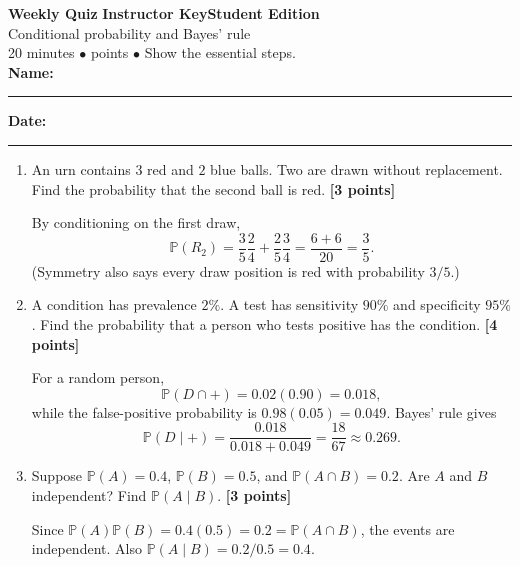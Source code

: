\documentclass[11pt]{article}
\newcounter{quiznum}
\newcommand{\Prob}{\mathbb P}
\newcommand{\edition}{\ifanswers Instructor Key\else Student Edition\fi}
\newcommand{\points}[1]{\hfill{\small\color{rose}\textbf{[#1 points]}}}
\newcommand{\quizheading}[1]{%
  \clearpage\stepcounter{quiznum}%
  \begin{tcolorbox}[
    enhanced,colback=paper,colframe=indigo,boxrule=1.1pt,arc=2mm,
    left=4mm,right=4mm,top=2.5mm,bottom=2.5mm,
    borderline west={4pt}{0pt}{violet}]
    {\Large\bfseries\color{indigo}Weekly Quiz \thequiznum}\hfill
    {\bfseries\color{violet}\edition}\\[-1pt]
    {\large\color{ink}#1}\\[2pt]
    {\small\color{muted}20 minutes \quad $\bullet$ \quad 10 points \quad $\bullet$ \quad Show the essential steps.}
    \ifanswers\else
      \\[5pt]\textbf{Name:}\ \rule{0.48\linewidth}{0.4pt}\hfill
      \textbf{Date:}\ \rule{0.20\linewidth}{0.4pt}
    \fi
  \end{tcolorbox}
}
\begin{document}
\quizheading{Conditional probability and Bayes' rule}
\begin{enumerate}
  \item An urn contains $3$ red and $2$ blue balls. Two are drawn without
  replacement. Find the probability that the second ball is red. \points{3}
  \begin{solution}[1.25in]
    By conditioning on the first draw,
    \[
    \Prob(R_2)=\frac35\frac24+\frac25\frac34=\frac{6+6}{20}=\frac35.
    \]
    (Symmetry also says every draw position is red with probability $3/5$.)
  \end{solution}

  \item A condition has prevalence $2\%$. A test has sensitivity $90\%$ and
  specificity $95\%$. Find the probability that a person who tests positive has
  the condition. \points{4}
  \begin{solution}[1.55in]
    For a random person,
    \[
      \Prob(D\cap +)=0.02(0.90)=0.018,
    \]
    while the false-positive probability is $0.98(0.05)=0.049$. Bayes' rule gives
    \[
      \Prob(D\mid +)=\frac{0.018}{0.018+0.049}=\frac{18}{67}\approx0.269.
    \]
  \end{solution}

  \item Suppose $\Prob(A)=0.4$, $\Prob(B)=0.5$, and $\Prob(A\cap B)=0.2$.
  Are $A$ and $B$ independent? Find $\Prob(A\mid B)$. \points{3}
  \begin{solution}[1.2in]
    Since $\Prob(A)\Prob(B)=0.4(0.5)=0.2=\Prob(A\cap B)$, the events are
    independent. Also $\Prob(A\mid B)=0.2/0.5=0.4$.
  \end{solution}
\end{enumerate}
\end{document}
